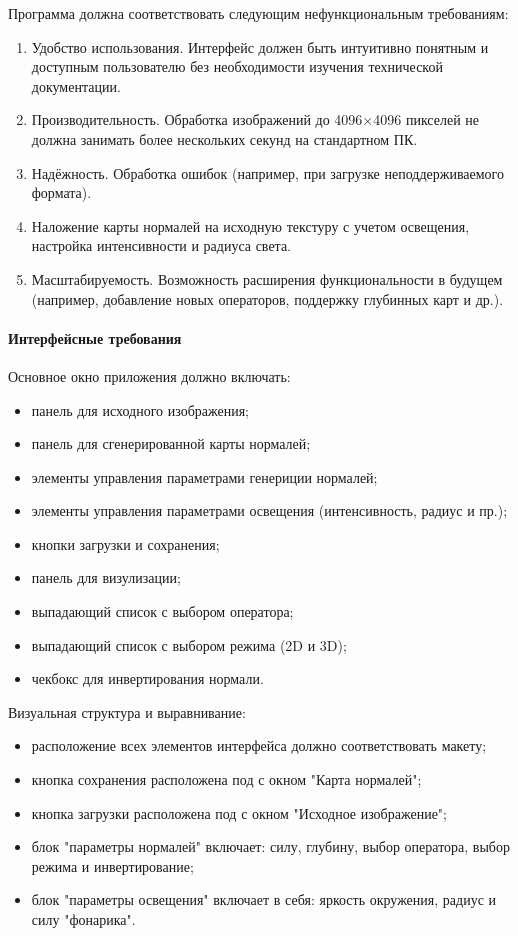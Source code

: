 Программа должна соответствовать следующим нефункциональным требованиям:
\begin{enumerate}
	\item Удобство использования. Интерфейс должен быть интуитивно понятным и доступным пользователю без необходимости изучения технической документации.
	\item Производительность. Обработка изображений до 4096×4096 пикселей не должна занимать более нескольких секунд на стандартном ПК.
	\item Надёжность. Обработка ошибок (например, при загрузке неподдерживаемого формата).
	\item Наложение карты нормалей на исходную текстуру с учетом освещения, настройка интенсивности и радиуса света.
	\item Масштабируемость. Возможность расширения функциональности в будущем (например, добавление новых операторов, поддержку глубинных карт и др.).
\end{enumerate}
\paragraph{Интерфейсные требования}

Основное окно приложения должно включать:
\begin{itemize}
	\item панель для исходного изображения;
	\item панель для сгенерированной карты нормалей;
	\item элементы управления параметрами генериции нормалей;
	\item элементы управления параметрами освещения (интенсивность, радиус и пр.);
	\item кнопки загрузки и сохранения;
	\item панель для визулизации;
	\item выпадающий список с выбором оператора;
	\item выпадающий список с выбором режима (2D и 3D);
	\item чекбокс для инвертирования нормали.
\end{itemize}

Визуальная структура и выравнивание:
\begin{itemize}
	\item расположение всех элементов интерфейса должно соответствовать макету;
	\item кнопка сохранения расположена под с окном "Карта нормалей";
	\item кнопка загрузки расположена под с окном "Исходное изображение";
	\item блок "параметры нормалей" включает: силу, глубину, выбор оператора, выбор режима и инвертирование;
	\item блок "параметры освещения" включает в себя: яркость окружения, радиус и силу "фонарика".
\end{itemize}

